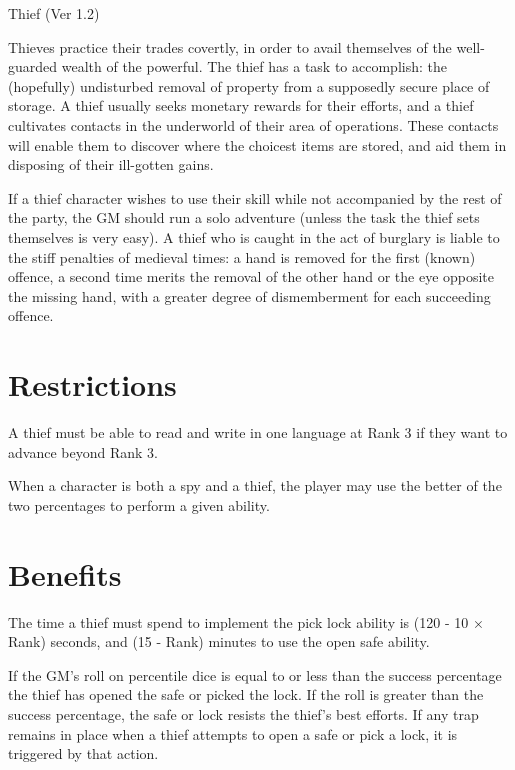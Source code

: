 \begin{Chapter}{Thief (Ver 1.2)}

Thieves practice their trades covertly, in order to avail themselves
of the well-guarded wealth of the powerful.  The thief has a task to
accomplish: the (hopefully) undisturbed removal of property from a
supposedly secure place of storage.  A thief usually seeks monetary
rewards for their efforts, and a thief cultivates contacts in the
underworld of their area of operations. These contacts will enable
them to discover where the choicest items are stored, and aid them in
disposing of their ill-gotten gains.

If a thief character wishes to use their skill while not accompanied
by the rest of the party, the GM should run a solo adventure (unless
the task the thief sets themselves is very easy).  A thief who is
caught in the act of burglary is liable to the stiff penalties of
medieval times: a hand is removed for the first (known) offence, a
second time merits the removal of the other hand or the eye opposite
the missing hand, with a greater degree of dismemberment for each
succeeding offence.

\section{Restrictions}

A thief must be able to read and write in one language at Rank 3 if
they want to advance beyond Rank 3.

When a character is both a spy and a thief, the player may use the
better of the two percentages to perform a given ability.

\section{Benefits}


The time a thief must spend to implement the pick lock ability is (120
- 10 × Rank) seconds, and (15 - Rank) minutes to use the open safe
ability.

If the GM’s roll on percentile dice is equal to or less than the
success percentage the thief has opened the safe or picked the lock.
If the roll is greater than the success percentage, the safe or lock
resists the thief’s best efforts.  If any trap remains in place when a
thief attempts to open a safe or pick a lock, it is triggered by that
action.


\end{Chapter}
